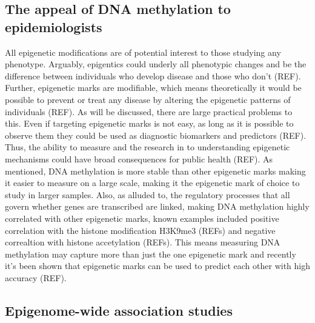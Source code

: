 \documentclass[11pt,twoside]{bristolthesis}
\begin{document}
\hypertarget{appeal-of-dnam}{%
\subsection{The appeal of DNA methylation to epidemiologists}\label{appeal-of-dnam}}

All epigenetic modifications are of potential interest to those studying any phenotype. Arguably, epigentics could underly all phenotypic changes and be the difference between individuals who develop disease and those who don't (REF). Further, epigenetic marks are modifiable, which means theoretically it would be possible to prevent or treat any disease by altering the epigenetic patterns of individuals (REF). As will be discussed, there are large practical problems to this. Even if targeting epigenetic marks is not easy, as long as it is possible to observe them they could be used as diagnostic biomarkers and predictors (REF). Thus, the ability to measure and the research in to understanding epigenetic mechanisms could have broad consequences for public health (REF). As mentioned, DNA methylation is more stable than other epigenetic marks making it easier to measure on a large scale, making it the epigenetic mark of choice to study in larger samples. Also, as alluded to, the regulatory processes that all govern whether genes are transcribed are linked, making DNA methylation highly correlated with other epigenetic marks, known examples included positive correlation with the histone modification H3K9me3 (REFs) and negative correaltion with histone accetylation (REFs). This means measuring DNA methylation may capture more than just the one epigenetic mark and recently it's been shown that epigenetic marks can be used to predict each other with high accuracy (REF).

\hypertarget{ewas}{%
\subsection{Epigenome-wide association studies}\label{ewas}}
\end{document}
